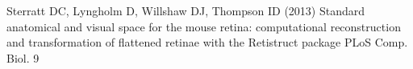 \documentclass{article}
\begin{document}


\begin{thebibliography}{99}
 Sterratt DC, Lyngholm D, Willshaw DJ,
  Thompson ID (2013) Standard anatomical and visual space for the
  mouse retina: computational reconstruction and transformation of
  flattened retinae with the Retistruct package \newblock PLoS
  Comp. Biol. 9
\end{thebibliography}
\end{document}
